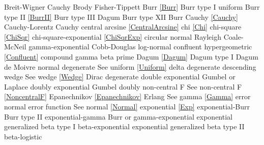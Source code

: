 Breit-Wigner  					\dotfill	Cauchy 							\ncite	%
Brody						\dotfill	Fisher-Tippett						\ncite	%
Burr							\dotfill	\eqref{Burr} 						\ncite	%
Burr	type I					\dotfill	uniform 							\ncite	%
Burr type II					\dotfill	\eqref{BurrII} 						\ncite	%
Burr type III					\dotfill	Dagum							\ncite	%
Burr type XII					\dotfill	Burr 								\ncite	%
%
Cauchy	 					\dotfill	\eqref{Cauchy} 							%
Cauchy-Lorentz 				\dotfill	Cauchy 							\ncite	%
central arcsine 					\dotfill	\eqref{CentralArcsine} 				\ncite	%
chi							\dotfill	\eqref{Chi}						\ncite	%
chi-square						\dotfill	\eqref{ChiSqr}						\ncite	%
chi-square-exponential			\dotfill	\eqref{ChiSqrExp}					\mcite{\self}	%
circular normal					\dotfill	Rayleigh							\ncite %
Coale-McNeil 					\dotfill	gamma-exponential 					     %
Cobb-Douglas					\dotfill	log-normal 						\ncite	%
confluent hypergeometric 			\dotfill	\eqref{Confluent}					\ncite
compound gamma				\dotfill	beta prime							%
%
Dagum 						\dotfill	\eqref{Dagum} 						\ncite	%
Dagum type I 					\dotfill	Dagum							\ncite	%
de Moivre						\dotfill	normal 							\ncite	%
degenerate					\dotfill	See uniform \eqref{Uniform} 			\ncite	%
delta  						\dotfill	degenerate  						\ncite 	%
descending wedge				\dotfill	See wedge \eqref{Wedge} 			\ncite	%
Dirac							\dotfill	degenerate						\ncite	
double exponential 				\dotfill	Gumbel or Laplace 					\ncite	%
doubly exponential				\dotfill	Gumbel							\ncite	%
doubly non-central F       			 \dotfill	See non-central F  \eqref{NoncentralF} 	\ncite 
%
Epanechnikov					\dotfill	\eqref{Epanechnikov}				\ncite
Erlang						\dotfill	See gamma \eqref{Gamma} 			\ncite 	%
error 						\dotfill	normal 							\ncite	%
error function					\dotfill	See normal \eqref{Normal}			\ncite	%
exponential 					\dotfill	\eqref{Exp} 						\ncite	%
exponential-Burr				\dotfill	Burr type II 						\ncite	%
exponential-gamma				\dotfill	Burr 	or gamma-exponential			  		%
exponential generalized beta type I 	\dotfill	beta-exponential					 	%
exponential generalized beta type II 	\dotfill	beta-logistic						 	%
